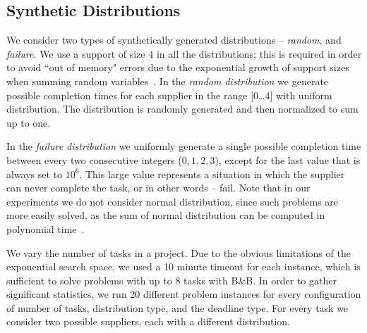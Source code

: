 \documentclass[letterpaper]{article} %
\newcommand{\bnb}{\textsc{B\&B}\xspace}
\newcommand\Roni[1]{\nb{\textbf{Roni:}}{blue}{#1}}
\begin{document}
\subsection{Synthetic Distributions}
\label{sec:SynthericDist}
We consider two types of synthetically generated distributions -- \emph{random}, and \emph{failure}. 
We use a support of size 4 in all the distributions; this is required in order to avoid ``out of memory" errors due to the exponential growth of support sizes when summing random variables~\cite[Lemma~1]{cohen2019estimating}.  
In the \emph{random distribution} we generate possible completion times for each supplier in the range [0\dots 4] with uniform distribution. The distribution is randomly generated and then normalized to sum up to one.

In the \emph{failure distribution} we uniformly generate a single possible completion time between every two consecutive integers ($0,1,2,3$), except for the last value that is always set to $10^6$. This large value represents a situation in which the supplier can never complete the task, or in other words -- fail. %
Note that in our experiments we do not consider normal distribution, since such problems are more easily solved, as the sum of normal distribution can be computed in polynomial time~\cite{schattenberg2005project,olya2014applying}.


We vary the number of tasks in a project. Due to the obvious limitations of the exponential search space, we used a 10 minute timeout for each instance, which is sufficient to solve problems with up to 8 tasks with \bnb. 
In order to gather significant statistics, we run 20 different problem instances for every configuration of number of tasks, distribution type, and the deadline type. For every task we consider two possible suppliers, each with a different distribution.   
\end{document}
